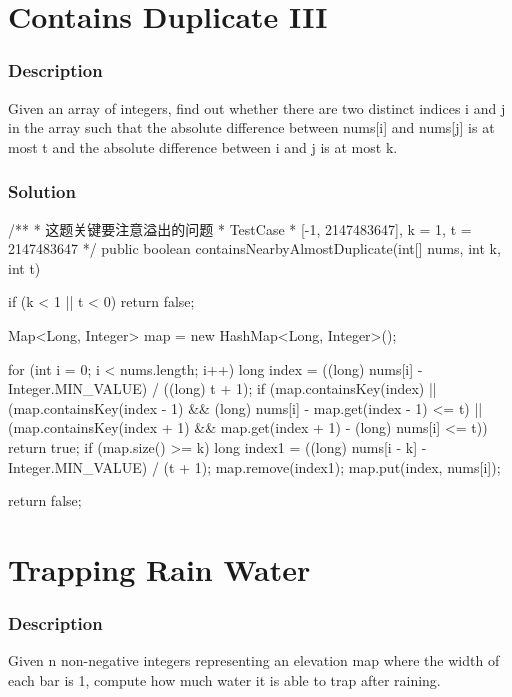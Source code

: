 \newpage

\section{Contains Duplicate III} %

\subsubsection{Description}
Given an array of integers, find out whether there are two distinct indices i and j in the array such that the absolute difference between nums[i] and nums[j] is at most t and the absolute difference between i and j is at most k.

\subsubsection{Solution}

\begin{Code}
/**
 * 这题关键要注意溢出的问题
 * TestCase
 * [-1, 2147483647], k = 1, t = 2147483647
 */
public boolean containsNearbyAlmostDuplicate(int[] nums, int k, int t) {
    if (k < 1 || t < 0) {
        return false;
    }

    Map<Long, Integer> map = new HashMap<Long, Integer>();

    for (int i = 0; i < nums.length; i++) {
        long index = ((long) nums[i] - Integer.MIN_VALUE) / ((long) t + 1);
        if (map.containsKey(index) ||
                (map.containsKey(index - 1) && (long) nums[i] - map.get(index - 1) <= t)
                || (map.containsKey(index + 1) && map.get(index + 1) - (long) nums[i] <= t)) {
            return true;
        }
        if (map.size() >= k) {
            long index1 = ((long) nums[i - k] - Integer.MIN_VALUE) / (t + 1);
            map.remove(index1);
        }
        map.put(index, nums[i]);
    }

    return false;
 }
\end{Code}

\newpage

\section{Trapping Rain Water} %

\subsubsection{Description}
Given n non-negative integers representing an elevation map where the width of each bar is 1, compute how much water it is able to trap after raining.

